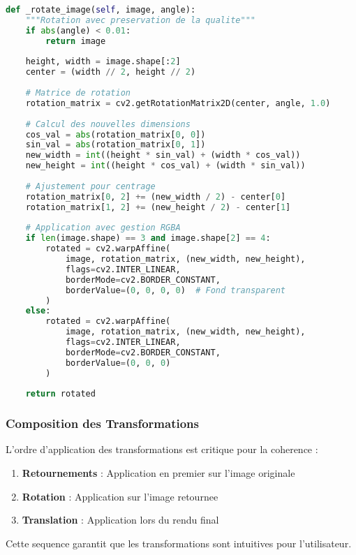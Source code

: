 \documentclass[12pt,a4paper]{article}
\begin{document}
\begin{lstlisting}[language=Python]
def _rotate_image(self, image, angle):
    """Rotation avec preservation de la qualite"""
    if abs(angle) < 0.01:
        return image
    
    height, width = image.shape[:2]
    center = (width // 2, height // 2)
    
    # Matrice de rotation
    rotation_matrix = cv2.getRotationMatrix2D(center, angle, 1.0)
    
    # Calcul des nouvelles dimensions
    cos_val = abs(rotation_matrix[0, 0])
    sin_val = abs(rotation_matrix[0, 1])
    new_width = int((height * sin_val) + (width * cos_val))
    new_height = int((height * cos_val) + (width * sin_val))
    
    # Ajustement pour centrage
    rotation_matrix[0, 2] += (new_width / 2) - center[0]
    rotation_matrix[1, 2] += (new_height / 2) - center[1]
    
    # Application avec gestion RGBA
    if len(image.shape) == 3 and image.shape[2] == 4:
        rotated = cv2.warpAffine(
            image, rotation_matrix, (new_width, new_height),
            flags=cv2.INTER_LINEAR,
            borderMode=cv2.BORDER_CONSTANT,
            borderValue=(0, 0, 0, 0)  # Fond transparent
        )
    else:
        rotated = cv2.warpAffine(
            image, rotation_matrix, (new_width, new_height),
            flags=cv2.INTER_LINEAR,
            borderMode=cv2.BORDER_CONSTANT,
            borderValue=(0, 0, 0)
        )
    
    return rotated
\end{lstlisting}

\subsubsection{Composition des Transformations}

L'ordre d'application des transformations est critique pour la coherence :

\begin{enumerate}
\item \textbf{Retournements} : Application en premier sur l'image originale
\item \textbf{Rotation} : Application sur l'image retournee
\item \textbf{Translation} : Application lors du rendu final
\end{enumerate}

Cette sequence garantit que les transformations sont intuitives pour l'utilisateur.
\end{document}
